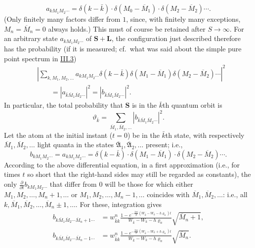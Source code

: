 \documentclass[fontsize=13pt,twoside,openany,headings=normal,parskip=false,bookmarkpackage=false,DIV=calc]{scrbook}
\begin{document}
\[
 a_{kM_1M_2\cdots}=\delta(k-\bar k)\cdot\delta(M_0-\overline M_1)\cdot\delta(M_2-\overline M_2)\cdots.
\]
(Only finitely many factors differ from $1$, since, with finitely many exceptions, $M_n=\overline M_n=0$ always holds.) This must of course be retained after $S\longrightarrow\infty$. For an arbitrary state $a_{kM_1M_2\cdots}$ of $\boldsymbol{S}+\boldsymbol{L}$, the configuration just described therefore has the probability (if it is measured; cf.\ what was said about the simple pure point spectrum in \hyperref[sec:III.3]{III.3})
\begin{align*}
 &\left|\sum_{k,M_1,M_2,\ldots}a_{kM_1M_2\cdots}
 \delta(k-\bar k)\delta(M_1-\overline M_1)\delta(M_2-\overline M_2)\cdots\right|^2\\
 &\qquad=|a_{\bar k\overline M_1\overline M_2\cdots}|^2
 =|b_{\bar k\overline M_1\overline M_2\cdots}|^2.
\end{align*}
In particular, the total probability that $\boldsymbol{S}$ is in the $\bar k$th quantum orbit is
\[
 \vartheta_{\bar k}=\sum_{\overline M_1,\overline M_2,\ldots}
 |b_{\bar k\overline M_1\overline M_2\cdots}|^2.
\]
Let the atom at the initial instant ($t=0$) be in the $\bar k$th state, with respectively $\overline M_1,\overline M_2,\ldots$ light quanta in the states $\overline{\mathfrak A}_1,\overline{\mathfrak A}_2,\ldots$ present; i.e.,
\[
 b_{kM_1M_2\cdots}=a_{kM_1M_2\cdots}
 =\delta(k-\bar k)\cdot\delta(M_1-\overline M_1)\cdot\delta(M_2-\overline M_2)\cdots.
\]
According to the above differential equation, in a first approximation (i.e., for times $t$ so short that the right-hand sides may still be regarded as
\hypertarget{origpage-152}{}constants), the only $\frac\partial{\partial t}b_{kM_1M_2\cdots}$ that differ from $0$ will be those for which either $M_1,M_2,\ldots,M_n+1,\ldots$ or $M_1,M_2,\ldots,M_n-1,\ldots$ coincides with $\overline M_1,\overline M_2,\ldots$: i.e., all $k,\overline M_1,\overline M_2,\ldots,\overline M_n\pm1,\ldots$. For these, integration gives
\begin{align*}
 b_{k\overline M_1\overline M_2\cdots\overline M_n+1\cdots}
 &=w_{\bar k k}^n\frac{1-e^{-\frac{2\pi i}{h}(W_{\bar k}-W_k-h\varrho_n)t}}
 {W_{\bar k}-W_k-h\varrho_n}\sqrt{\overline M_n+1},\\
 b_{k\overline M_1\overline M_2\cdots\overline M_n-1\cdots}
 &=w_{\bar k k}^n\frac{1-e^{-\frac{2\pi i}{h}(W_{\bar k}-W_k+h\varrho_n)t}}
 {W_{\bar k}-W_k-h\varrho_n}\sqrt{\overline M_n}.
\end{align*}
\end{document}
